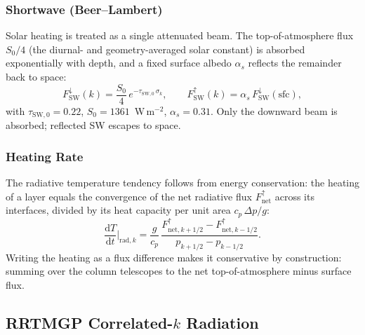 \documentclass[11pt,twoside]{report}
\newcommand{\dd}{\mathrm{d}}
\newcommand{\cpd}{c_p}
\begin{document}
\subsubsection{Shortwave (Beer--Lambert)}

Solar heating is treated as a single attenuated beam. The top-of-atmosphere
flux $S_0/4$ (the diurnal- and geometry-averaged solar constant) is absorbed
exponentially with depth, and a fixed surface albedo $\alpha_s$ reflects the
remainder back to space:
\begin{equation}
  F^\downarrow_{\mathrm{SW}}(k) = \frac{S_0}{4}\,
  e^{-\tau_{\mathrm{SW},0}\,\sigma_k},
  \qquad
  F^\uparrow_{\mathrm{SW}}(k) = \alpha_s\,F^\downarrow_{\mathrm{SW}}(\mathrm{sfc}),
\end{equation}
with $\tau_{\mathrm{SW},0}=0.22$, $S_0=1361$~W\,m$^{-2}$, $\alpha_s=0.31$.
Only the downward beam is absorbed; reflected SW escapes to space.

\subsubsection{Heating Rate}

The radiative temperature tendency follows from energy conservation: the
heating of a layer equals the convergence of the net radiative flux
$F^\uparrow_{\mathrm{net}}$ across its interfaces, divided by its heat
capacity per unit area $\cpd\,\Delta p/g$:
\begin{equation}
  \frac{\dd T}{\dd t}\bigg|_{\mathrm{rad},k}
  = \frac{g}{\cpd}\,
  \frac{F^{\uparrow}_{\mathrm{net},k+1/2}-F^{\uparrow}_{\mathrm{net},k-1/2}}
  {p_{k+1/2}-p_{k-1/2}}.
\end{equation}
Writing the heating as a flux difference makes it conservative by
construction: summing over the column telescopes to the net top-of-atmosphere
minus surface flux.

\subsection{RRTMGP Correlated-$k$ Radiation}
\label{sec:rrtmgp}
\end{document}
